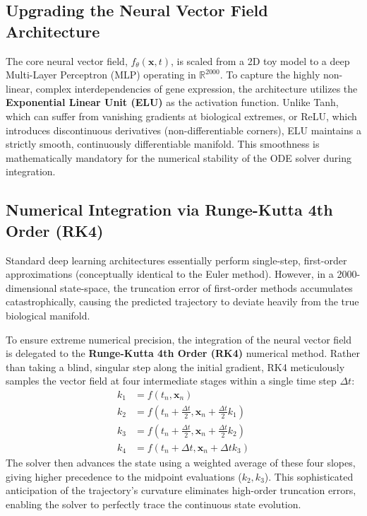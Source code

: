 \documentclass[12pt, a4paper]{article}
\begin{document}
	\subsection{Upgrading the Neural Vector Field Architecture}
	The core neural vector field, $f_\theta(\mathbf{x}, t)$, is scaled from a 2D toy model to a deep Multi-Layer Perceptron (MLP) operating in $\mathbb{R}^{2000}$. To capture the highly non-linear, complex interdependencies of gene expression, the architecture utilizes the \textbf{Exponential Linear Unit (ELU)} as the activation function. Unlike Tanh, which can suffer from vanishing gradients at biological extremes, or ReLU, which introduces discontinuous derivatives (non-differentiable corners), ELU maintains a strictly smooth, continuously differentiable manifold. This smoothness is mathematically mandatory for the numerical stability of the ODE solver during integration.
	
	\subsection{Numerical Integration via Runge-Kutta 4th Order (RK4)}
	Standard deep learning architectures essentially perform single-step, first-order approximations (conceptually identical to the Euler method). However, in a 2000-dimensional state-space, the truncation error of first-order methods accumulates catastrophically, causing the predicted trajectory to deviate heavily from the true biological manifold.
	
	To ensure extreme numerical precision, the integration of the neural vector field is delegated to the \textbf{Runge-Kutta 4th Order (RK4)} numerical method. Rather than taking a blind, singular step along the initial gradient, RK4 meticulously samples the vector field at four intermediate stages within a single time step $\Delta t$:
	\begin{align*}
		k_1 &= f(t_n, \mathbf{x}_n) \\
		k_2 &= f\left(t_n + \frac{\Delta t}{2}, \mathbf{x}_n + \frac{\Delta t}{2} k_1\right) \\
		k_3 &= f\left(t_n + \frac{\Delta t}{2}, \mathbf{x}_n + \frac{\Delta t}{2} k_2\right) \\
		k_4 &= f(t_n + \Delta t, \mathbf{x}_n + \Delta t k_3)
	\end{align*}
	The solver then advances the state using a weighted average of these four slopes, giving higher precedence to the midpoint evaluations ($k_2, k_3$). This sophisticated anticipation of the trajectory's curvature eliminates high-order truncation errors, enabling the solver to perfectly trace the continuous state evolution.
	
\end{document}
